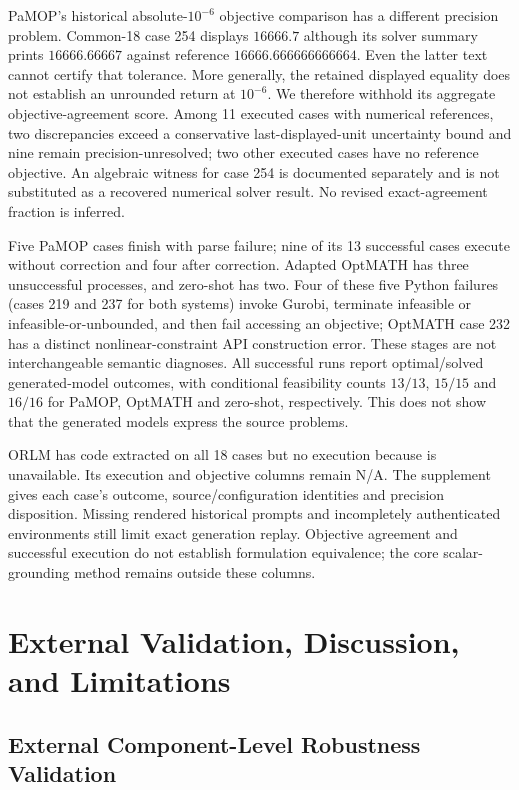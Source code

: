 \documentclass[pdflatex,sn-basic,Numbered]{sn-jnl}
\begin{document}
PaMOP's historical absolute-$10^{-6}$ objective comparison has a different precision problem. Common-18 case 254 displays $16666.7$ although its solver summary prints $16666.66667$ against reference $16666.666666666664$. Even the latter text cannot certify that tolerance. More generally, the retained displayed equality does not establish an unrounded return at $10^{-6}$. We therefore withhold its aggregate objective-agreement score. Among 11 executed cases with numerical references, two discrepancies exceed a conservative last-displayed-unit uncertainty bound and nine remain precision-unresolved; two other executed cases have no reference objective. An algebraic witness for case 254 is documented separately and is not substituted as a recovered numerical solver result. No revised exact-agreement fraction is inferred.

Five PaMOP cases finish with parse failure; nine of its 13 successful cases execute without correction and four after correction. Adapted OptMATH has three unsuccessful processes, and zero-shot has two. Four of these five Python failures (cases 219 and 237 for both systems) invoke Gurobi, terminate infeasible or infeasible-or-unbounded, and then fail accessing an objective; OptMATH case 232 has a distinct nonlinear-constraint API construction error. These stages are not interchangeable semantic diagnoses. All successful runs report optimal/solved generated-model outcomes, with conditional feasibility counts $13/13$, $15/15$ and $16/16$ for PaMOP, OptMATH and zero-shot, respectively. This does not show that the generated models express the source problems.

ORLM has code extracted on all 18 cases but no execution because  is unavailable. Its execution and objective columns remain N/A. The supplement gives each case's outcome, source/configuration identities and precision disposition. Missing rendered historical prompts and incompletely authenticated environments still limit exact generation replay. Objective agreement and successful execution do not establish formulation equivalence; the core scalar-grounding method remains outside these columns.



\section{External Validation, Discussion, and Limitations}
\label{sec:discussion}
\subsection{External Component-Level Robustness Validation}
\label{subsec:exp_external_validation}
\end{document}
